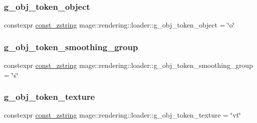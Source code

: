 \hypertarget{namespacemage_1_1rendering_1_1loader_a8127f2d8ffe798289f55d789c317ef19}{}\label{namespacemage_1_1rendering_1_1loader_a8127f2d8ffe798289f55d789c317ef19} 
\subsubsection{\texorpdfstring{g\+\_\+obj\+\_\+token\+\_\+object}{g\_obj\_token\_object}}
{\footnotesize\ttfamily constexpr \hyperlink{namespacemage_abfd9206dc607ceb5d13ec68bf075a5c0}{const\+\_\+zstring} mage\+::rendering\+::loader\+::g\+\_\+obj\+\_\+token\+\_\+object = \char`\"{}o\char`\"{}}

\hypertarget{namespacemage_1_1rendering_1_1loader_aa21b49ead7809938e24c738c71f408c0}{}\label{namespacemage_1_1rendering_1_1loader_aa21b49ead7809938e24c738c71f408c0} 
\subsubsection{\texorpdfstring{g\+\_\+obj\+\_\+token\+\_\+smoothing\+\_\+group}{g\_obj\_token\_smoothing\_group}}
{\footnotesize\ttfamily constexpr \hyperlink{namespacemage_abfd9206dc607ceb5d13ec68bf075a5c0}{const\+\_\+zstring} mage\+::rendering\+::loader\+::g\+\_\+obj\+\_\+token\+\_\+smoothing\+\_\+group = \char`\"{}s\char`\"{}}

\hypertarget{namespacemage_1_1rendering_1_1loader_a2f28917cef298bc975a0a9b5ceecfb34}{}\label{namespacemage_1_1rendering_1_1loader_a2f28917cef298bc975a0a9b5ceecfb34} 
\subsubsection{\texorpdfstring{g\+\_\+obj\+\_\+token\+\_\+texture}{g\_obj\_token\_texture}}
{\footnotesize\ttfamily constexpr \hyperlink{namespacemage_abfd9206dc607ceb5d13ec68bf075a5c0}{const\+\_\+zstring} mage\+::rendering\+::loader\+::g\+\_\+obj\+\_\+token\+\_\+texture = \char`\"{}vt\char`\"{}}

